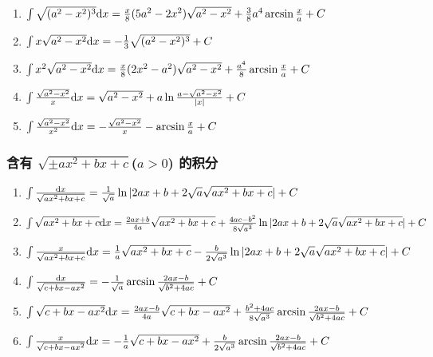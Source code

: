 \begin{small}
\begin{enumerate}
\item $ \int \sqrt{(a^2-x^2)^3}\mathrm{d} x = \frac{x}{8}(5a^2-2x^2)\sqrt{a^2-x^2}+\frac{3}{8}a^4\arcsin\frac{x}{a} + C $

\item $ \int x\sqrt{a^2-x^2}\mathrm{d} x = -\frac{1}{3}\sqrt{(a^2-x^2)^3} + C $

\item $ \int x^2\sqrt{a^2-x^2}\mathrm{d} x = \frac{x}{8}(2x^2-a^2)\sqrt{a^2-x^2}+\frac{a^4}{8}\arcsin\frac{x}{a} + C $

\item $ \int \frac{\sqrt{a^2-x^2}}{x}\mathrm{d} x = \sqrt{a^2-x^2} + a \ln \frac{a-\sqrt{a^2-x^2}}{|x|} + C $

\item $ \int \frac{\sqrt{a^2-x^2}}{x^2} \mathrm{d} x = -\frac{\sqrt{a^2-x^2}}{x} - \arcsin\frac{x}{a} + C $

\end{enumerate}

\subsubsection{含有 $\sqrt{\pm ax^2+bx+c}$($a>0$) 的积分}

\begin{enumerate}

\item $ \int \frac{\mathrm{d} x}{\sqrt{ax^2+bx+c}} = \frac{1}{\sqrt{a}} \ln | 2ax+b+2\sqrt{a}\sqrt{ax^2+bx+c} | + C $

\item $ \int \sqrt{ax^2+bx+c} \mathrm{d} x = \frac{2ax+b}{4a}\sqrt{ax^2+bx+c} +
	\frac{4ac-b^2}{8\sqrt{a^3}}\ln |2ax+b+2\sqrt{a}\sqrt{ax^2+bx+c}| + C $

\item $ \int \frac{x}{\sqrt{ax^2+bx+c}} \mathrm{d} x = \frac{1}{a}\sqrt{ax^2+bx+c} -
	\frac{b}{2\sqrt{a^3}}\ln | 2ax+b+2\sqrt{a}\sqrt{ax^2+bx+c} | + C $

\item $ \int \frac{\mathrm{d} x}{\sqrt{c+bx-ax^2}} = -\frac{1}{\sqrt{a}} \arcsin \frac{2ax-b}{\sqrt{b^2+4ac}} + C  $

\item $ \int \sqrt{c+bx-ax^2} \mathrm{d} x = \frac{2ax-b}{4a}\sqrt{c+bx-ax^2} + \\
	\frac{b^2+4ac}{8\sqrt{a^3}}\arcsin\frac{2ax-b}{\sqrt{b^2+4ac}} + C $

\item $ \int \frac{x}{\sqrt{c+bx-ax^2}} \mathrm{d} x = -\frac{1}{a}\sqrt{c+bx-ax^2} + \frac{b}{2\sqrt{a^3}}\arcsin\frac{2ax-b}{\sqrt{b^2+4ac}} + C $


\end{enumerate}
\end{small}
